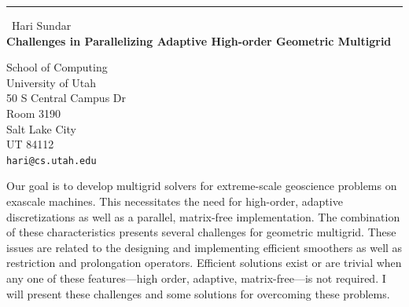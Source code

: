 \documentclass{report}
\begin{document}
\begin{center}
\rule{6in}{1pt} \
{\large Hari Sundar \\
{\bf Challenges in Parallelizing Adaptive High-order Geometric Multigrid}}

School of Computing \\ University of Utah \\ 50 S Central Campus Dr \\ Room 3190 \\ Salt Lake City \\ UT 84112
\\
{\tt hari@cs.utah.edu}\end{center}

Our goal is to develop multigrid solvers for extreme-scale geoscience
problems on exascale machines. This necessitates the need for high-order,
adaptive discretizations as well as a parallel, matrix-free
implementation. The combination of these characteristics presents several
challenges for geometric multigrid. These issues are related to the
designing and implementing efficient smoothers as well as restriction and
prolongation operators. Efficient solutions exist or are trivial when any
one of these features---high order, adaptive, matrix-free---is not
required. I will present these challenges and some solutions for
overcoming these problems.
\end{document}
